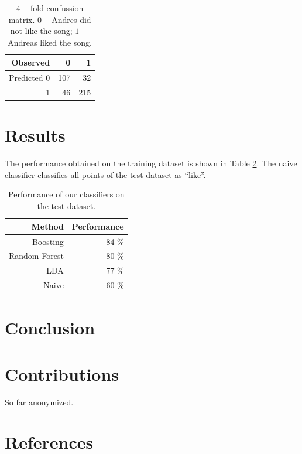 \documentclass{article}
\begin{document}
\begin {table}[h]
\begin{center}
\begin{tabular}{r|r|r}
  Observed & 0  & 1 \\
  \hline			
  Predicted 0 & 107 & 32 \\
  1 & 46 & 215 \\ 
\end{tabular}
\end{center}
\caption {$4-$fold confussion matrix. $0-$Andres did not like the song; $1-$Andreas liked the song.} 
\label{tab:confussion_matrix} 
\end {table}

\section{Results}

The performance obtained on the training dataset is shown in Table \ref{tab:performance}.
The naive classifier classifies all points of the test dataset as ``like''.

\begin {table}[h]
\begin{center}
\begin{tabular}{r|r}
  Method & Performance   \\
  \hline			
  Boosting & 84 \% \\
  Random Forest & 80 \% \\
  LDA & 77 \% \\
  Naive & 60 \%
\end{tabular}
\end{center}
\caption {Performance of our classifiers on the test dataset.} 
\label{tab:performance} 
\end {table}

\section{Conclusion}

\section{Contributions}

So far anonymized.


\section*{References}
\end{document}
